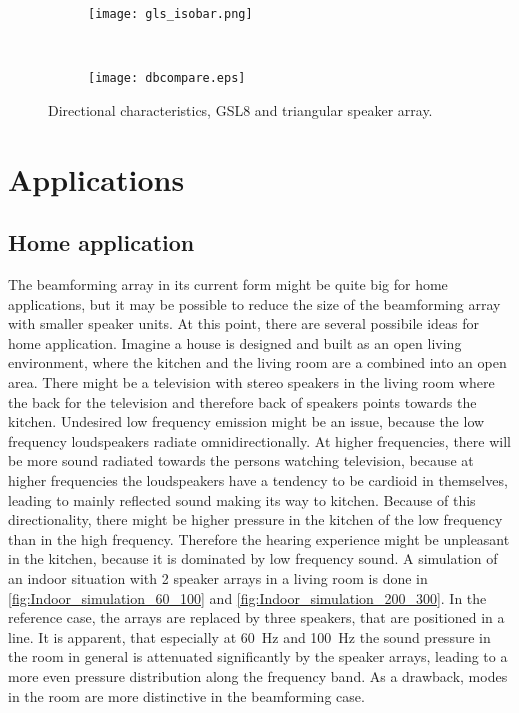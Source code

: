\begin{figure}[H]
\centering
	\begin{subfigure}[H]{0.7\textwidth}
		\centering
		\texttt{[image: gls\_isobar.png]}
		\label{fig:gls_iso}
	\end{subfigure}\\
	\begin{subfigure}[H]{0.95\textwidth}
		\centering
		\texttt{[image: dbcompare.eps]}
		\label{fig:array_iso}
	\end{subfigure}
\caption{Directional characteristics, GSL8 and triangular speaker array.}
\label{fig:isobars}
\end{figure}
\section{Applications}\label{sec:applications}
\subsection{Home application}
The beamforming array in its current form might be quite big for home applications, but it may be possible to reduce the size of the beamforming array with smaller speaker units. At this point, there are several possibile ideas for home application. Imagine a house is designed and built as an open living environment, where the kitchen and the living room are a combined into an open area. There might be a television with stereo speakers in the living room where the back for the television and therefore back of speakers points towards the kitchen. Undesired low frequency emission might be an issue, because the low frequency loudspeakers radiate omnidirectionally. At higher frequencies, there will be more sound radiated towards the persons watching television, because at higher frequencies the loudspeakers have a tendency to be cardioid in themselves, leading to mainly reflected sound making its way to kitchen. Because of this directionality, there might be higher pressure in the kitchen of the low frequency than in the high frequency. Therefore the hearing experience might be unpleasant in the kitchen, because it is dominated by low frequency sound. A simulation of an indoor situation with 2 speaker arrays in a living room is done in \autoref{fig:Indoor_simulation_60_100} and \autoref{fig:Indoor_simulation_200_300}. In the reference case, the arrays are replaced by three speakers, that are positioned in a line. It is apparent, that especially at \SI{60}{\hertz} and \SI{100}{\hertz} the sound pressure in the room in general is attenuated significantly by the speaker arrays, leading to a more even pressure distribution along the frequency band. As a drawback, modes in the room are more distinctive in the beamforming case.


